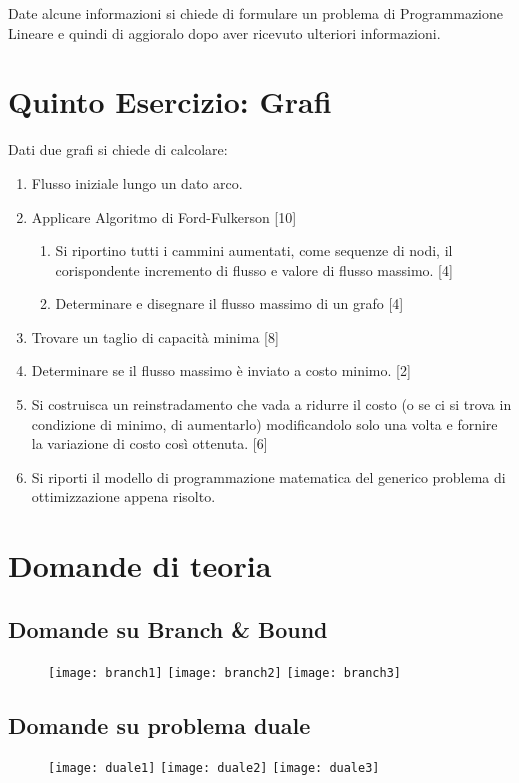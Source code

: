 \documentclass[\main/main.tex]{subfiles}
\begin{document}
Date alcune informazioni si chiede di formulare un problema di Programmazione Lineare e quindi di aggioralo dopo aver ricevuto ulteriori informazioni.

\section{Quinto Esercizio: Grafi}
Dati due grafi si chiede di calcolare:

\begin{enumerate}
  \item Flusso iniziale lungo un dato arco.
  \item Applicare Algoritmo di Ford-Fulkerson [10]
        \begin{enumerate}
          \item Si riportino tutti i cammini aumentati, come sequenze di nodi, il corispondente incremento di flusso e valore di flusso massimo. [4]
          \item Determinare e disegnare il flusso massimo di un grafo [4]
        \end{enumerate}
  \item Trovare un taglio di capacità minima [8]
  \item Determinare se il flusso massimo è inviato a costo minimo. [2]
  \item Si costruisca un reinstradamento che vada a ridurre il costo (o se ci si trova in condizione di minimo, di aumentarlo) modificandolo solo una volta e fornire la variazione di costo così ottenuta. [6]
  \item Si riporti il modello di programmazione matematica del generico problema di ottimizzazione appena risolto.
\end{enumerate}

\section{Domande di teoria}

\subsection{Domande su Branch \& Bound}
\begin{figure}
  \texttt{[image: branch1]}
  \texttt{[image: branch2]}
  \texttt{[image: branch3]}
\end{figure}
\subsection{Domande su problema duale}
\begin{figure}
  \texttt{[image: duale1]}
  \texttt{[image: duale2]}
  \texttt{[image: duale3]}
\end{figure}
\end{document}
